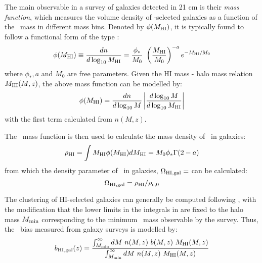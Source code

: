 The main observable in a survey of galaxies detected in 21 cm is their \textit{mass function}, which measures the volume density of \HI-selected galaxies as a function of the \HI\ mass in different mass bins. Denoted by $\phi(M_{\rm HI})$, it is typically found to follow a functional form of the type \cite{martin10, zwaan05}:
\begin{equation}
 \phi(M_{\rm HI}) \equiv \frac{dn}{d \log_{10} M_{\rm HI}} =  \frac{\phi_*}{M_0} \ \left(\frac{M_{\rm HI}}{M_0} \right)^{-a} e^{-M_{\rm HI}/M_0}
\end{equation} 
where $\phi_*, a$ and $M_0$ are free parameters.
Given the HI mass - halo mass relation $M_{\rm HI}(M,z)$, the above mass function can be modelled by:
\begin{equation}
    \phi(M_{\rm HI}) = \frac{dn}{d \log_{10} M} \left|\frac{d \log_{10} M}{d \log_{10} M_{\rm HI}}\right|
    \label{phifrommhi}
\end{equation}
with the first term calculated from $n(M,z)$.



The \HI\ mass function is then used to calculate the mass density of \HI\ in galaxies:
\begin{equation}
 \rho_{\rm HI} = \int M_{\rm HI} \phi(M_{\rm HI}) d M_{\rm HI} = M_0 \phi_* \Gamma(2 - a) 
\end{equation}
from which the density parameter of \HI\ in galaxies, $\Omega_{\rm HI, gal} = $ can be calculated:
\begin{equation}
  \Omega_{\rm HI, gal} =  \rho_{\rm HI}/\rho_{c,0}
\end{equation}



The clustering of HI-selected galaxies can generally be computed following , with the modification that the lower limits in the integrals in  are fixed to the halo mass $M_{\rm min}$ corresponding to the minimum \HI\ mass observable by the survey. Thus, the \HI\ bias measured from galaxy surveys is modelled by:
\begin{equation}
b_{\rm HI,gal} (z) = \frac{\int_{M_{\rm min}}^{\infty} dM \ n(M,z)\ b (M,z) \ M_{\rm HI} (M,z)}{\int_{M_{\rm min}}^{\infty} dM \  n(M,z) \ M_{\rm HI} (M,z)}
\label{biasHIgal}
\end{equation}

